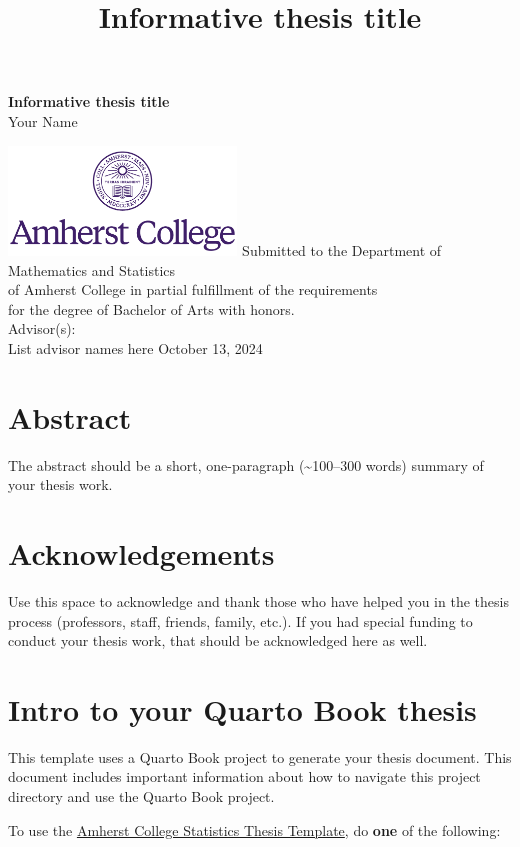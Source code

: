 \documentclass[
  11pt,
  letterpaper,
  twoside]{report}
\title{Informative thesis title}
\renewcommand*\contentsname{Table of contents}
\newcommand\contentsname{Table of contents}
\def\maketitle{
\pagenumbering{roman}
{\thispagestyle{empty}%
  \null\vskip 1in
  \begin{center}\fontsize{24}{28}\sf
     \textbf{Informative thesis title}\\[2cm]
     \fontsize{18}{20}\sf Your Name\\[0.2cm]
     
     \vfill
     
     \includegraphics[height=1.15in]{includes/Amherst-College-wordmark-seal-centered-purple-RGB-900px.png}
     \vskip 0.5in
     \fontsize{13}{15}\sf Submitted to the Department of Mathematics and
Statistics\\
     of Amherst College in partial fulfillment of the requirements \\
     for the degree of Bachelor of Arts with honors.\\
     \vskip 0.5in
     Advisor(s):\\
     \fontsize{13}{15}\sf List advisor names here
    \vskip 0.5in
    October 13, 2024
  \end{center}
  \newpage\mbox{}\thispagestyle{empty}\newpage
}
}
\begin{document}
\maketitle

\renewcommand*\contentsname{Table of contents}
{
\hypersetup{linkcolor=}
\setcounter{tocdepth}{1}
\tableofcontents
}


\chapter*{Abstract}\label{abstract}


The abstract should be a short, one-paragraph (\textasciitilde100--300
words) summary of your thesis work.


\chapter*{Acknowledgements}\label{acknowledgements}


Use this space to acknowledge and thank those who have helped you in the
thesis process (professors, staff, friends, family, etc.). If you had
special funding to conduct your thesis work, that should be acknowledged
here as well.

\cleardoublepage{}\setcounter{page}{1}


\chapter{Intro to your Quarto Book thesis}\label{sec-intro}

This template uses a Quarto Book project to generate your thesis
document. This document includes important information about how to
navigate this project directory and use the Quarto Book project.

To use the
\href{https://github.com/Amherst-Statistics/thesis?tab=readme-ov-file\#amherst-college-statistics-thesis-template}{Amherst
College Statistics Thesis Template}, do \textbf{one} of the following:
\end{document}
